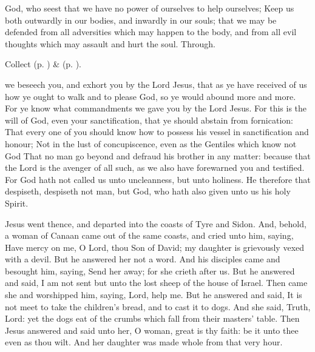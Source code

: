 \collect
{} God, who seest that we have no power of ourselves to help ourselves; Keep us both outwardly in our bodies, and inwardly in our souls; that we may be defended from all adversities which may happen to the body, and from all evil thoughts which may assault and hurt the soul. Through.
\begin{rubric}
     Collect  (p. \pageref{AshWednesdayMassCollect}) \&   (p. \pageref{SPLivingDeparted}).
\end{rubric}

\clearpage

 we beseech you, and exhort you by the Lord Jesus, that as ye have received of us how ye ought to walk and to please God, so ye would abound more and more. For ye know what commandments we gave you by the Lord Jesus. For this is the will of God, even your sanctification, that ye should abstain from fornication: That every one of you should know how to possess his vessel in sanctification and honour; Not in the lust of concupiscence, even as the Gentiles which know not God That no man go beyond and defraud his brother in any matter: because that the Lord is the avenger of all such, as we also have forewarned you and testified. For God hath not called us unto uncleanness, but unto holiness. He therefore that despiseth, despiseth not man, but God, who hath also given unto us his holy Spirit.


 Jesus went thence, and departed into the coasts of Tyre and Sidon. And, behold, a woman of Canaan came out of the same coasts, and cried unto him, saying, Have mercy on me, O Lord, thou Son of David; my daughter is grievously vexed with a devil. But he answered her not a word. And his disciples came and besought him, saying, Send her away; for she crieth after us. But he answered and said, I am not sent but unto the lost sheep of the house of Israel. Then came she and worshipped him, saying, Lord, help me. But he answered and said, It is not meet to take the children's bread, and to cast it to dogs. And she said, Truth, Lord: yet the dogs eat of the crumbs which fall from their masters' table. Then Jesus answered and said unto her, O woman, great is thy faith: be it unto thee even as thou wilt. And her daughter was made whole from that very hour.

